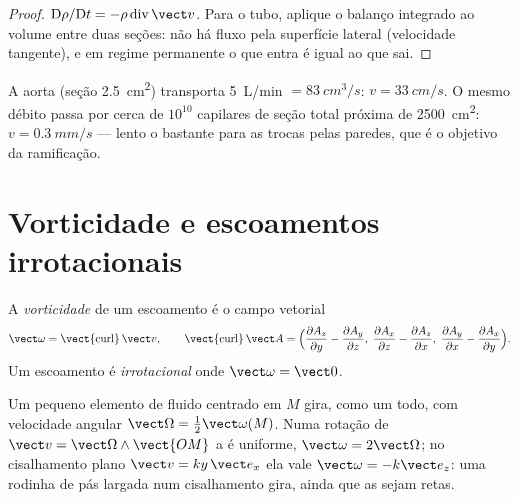 \begin{proof}
$\mathrm D\rho/\mathrm Dt = -\rho\operatorname{div}\vect v$. Para o tubo,
aplique o balanço integrado ao volume entre duas seções: não há
fluxo pela superfície lateral (velocidade tangente), e em regime permanente
o que entra é igual ao que sai.
\end{proof}

\begin{example}[O sangue]\label{ex:b2:fluid-kinematics:blood}
A aorta (seção \qty{2.5}{cm^2}) transporta \qty{5}{L/min} $= \qty{83}{cm^3/s}$:
$v = \qty{33}{cm/s}$. O mesmo débito passa por cerca de $10^{10}$
capilares de seção total próxima de \qty{2500}{cm^2}: $v = \qty{0.3}{mm/s}$ ---
lento o bastante para as trocas pelas paredes, que é o objetivo da ramificação.
\end{example}

\section{Vorticidade e escoamentos irrotacionais}

\begin{definition}[Vorticidade]\label{def:b2:fluid-kinematics:vorticity}
A \emph{vorticidade} de um escoamento é o campo vetorial
\[
\vect\omega = \operatorname{\vect{curl}}\vect v , \qquad
\operatorname{\vect{curl}}\vect A = \Bigl(\frac{\partial A_z}{\partial y} -
\frac{\partial A_y}{\partial z},\; \frac{\partial A_x}{\partial z} - \frac{\partial A_z}
{\partial x},\; \frac{\partial A_y}{\partial x} - \frac{\partial A_x}{\partial y}\Bigr) .
\]
Um escoamento é \emph{irrotacional} onde $\vect\omega = \vect 0$.
\end{definition}

\begin{proposition}\label{prop:b2:fluid-kinematics:rotation}
Um pequeno elemento de fluido centrado em $M$ gira, como um todo, com
velocidade angular $\vect\Omega = \tfrac12\vect\omega(M)$. Numa rotação de
 $\vect v = \vect\Omega\wedge\vect{OM}$ a  é uniforme,
$\vect\omega = 2\vect\Omega$; no cisalhamento plano $\vect v = ky\,\vect e_x$
ela vale $\vect\omega = -k\vect e_z$: uma rodinha de pás largada num cisalhamento
gira, ainda que as  sejam retas.
\end{proposition}

